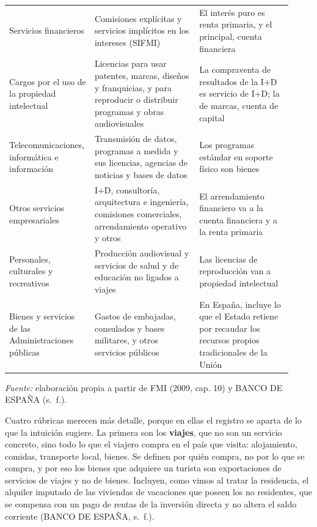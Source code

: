 \documentclass[10pt,a4paper]{article}
\begin{document}
\begin{center}
\begin{minipage}{\linewidth}
\begin{tabular}{p{0.24\linewidth}p{0.36\linewidth}p{0.32\linewidth}}
Servicios financieros & Comisiones explícitas y servicios implícitos en los intereses (SIFMI) & El interés puro es renta primaria, y el principal, cuenta financiera\\
Cargos por el uso de la propiedad intelectual & Licencias para usar patentes, marcas, diseños y franquicias, y para reproducir o distribuir programas y obras audiovisuales & La compraventa de resultados de la I+D es servicio de I+D; la de marcas, cuenta de capital\\
Telecomunicaciones, informática e información & Transmisión de datos, programas a medida y sus licencias, agencias de noticias y bases de datos & Los programas estándar en soporte físico son bienes\\
Otros servicios empresariales & I+D, consultoría, arquitectura e ingeniería, comisiones comerciales, arrendamiento operativo y otros & El arrendamiento financiero va a la cuenta financiera y a la renta primaria\\
Personales, culturales y recreativos & Producción audiovisual y servicios de salud y de educación no ligados a viajes & Las licencias de reproducción van a propiedad intelectual\\
Bienes y servicios de las Administraciones públicas & Gastos de embajadas, consulados y bases militares, y otros servicios públicos & En España, incluye lo que el Estado retiene por recaudar los recursos propios tradicionales de la Unión\\
\hline
\end{tabular}\par\vspace{0.3em}
{\small\textit{Fuente: }elaboración propia a partir de FMI (2009, cap. 10) y BANCO DE ESPAÑA (s.~f.).}
\end{minipage}\end{center}

Cuatro rúbricas merecen más detalle, porque en ellas el registro se aparta de lo que la intuición sugiere. La primera son los \textbf{viajes}, que no son un servicio concreto, sino todo lo que el viajero compra en el país que visita: alojamiento, comidas, transporte local, bienes. Se definen por quién compra, no por lo que se compra, y por eso los bienes que adquiere un turista son exportaciones de servicios de viajes y no de bienes. Incluyen, como vimos al tratar la residencia, el alquiler imputado de las viviendas de vacaciones que poseen los no residentes, que se compensa con un pago de rentas de la inversión directa y no altera el saldo corriente (BANCO DE ESPAÑA, s.~f.).
\end{document}
